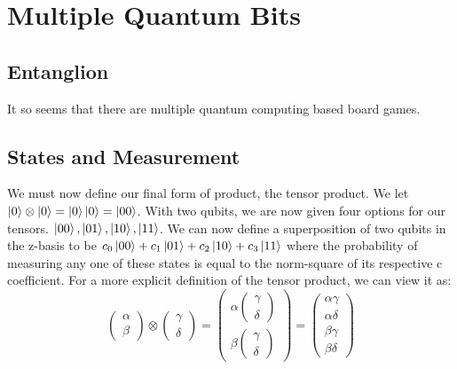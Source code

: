 \documentclass{article}
\begin{document}
\section{Multiple Quantum Bits} %

\subsection{Entanglion}

It so seems that there are multiple quantum computing based board games.

\subsection{States and Measurement}

We must now define our final form of product, the tensor product. We let $\ket{0} \otimes \ket{0} = \ket{0}\ket{0} = \ket{00}$. With two qubits, we are now given four options for our tensors. $\ket{00}, \ket{01}, \ket{10}, \ket{11}$. We can now define a superposition of two qubits in the z-basis to be $c_0\ket{00} + c_1\ket{01} + c_2\ket{10} + c_3\ket{11}$ where the probability of measuring any one of these states is equal to the norm-square of its respective c coefficient. For a more explicit definition of the tensor product, we can view it as:
\[
    \begin{pmatrix}
        \alpha \\
        \beta
    \end{pmatrix}
    \otimes
    \begin{pmatrix}
        \gamma \\
        \delta
    \end{pmatrix}
    =
    \begin{pmatrix}
        \alpha 
        \begin{pmatrix}
            \gamma \\
            \delta
        \end{pmatrix}
        \\
        \beta
        \begin{pmatrix}
            \gamma \\
            \delta
        \end{pmatrix}
    \end{pmatrix}
    = 
    \begin{pmatrix}
        \alpha\gamma \\
        \alpha\delta \\
        \beta\gamma \\
        \beta\delta
    \end{pmatrix}
\]
\end{document}
